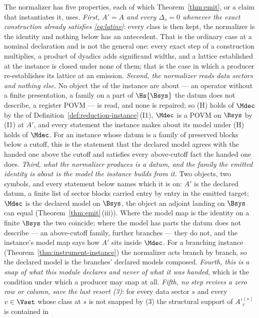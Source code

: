 \begin{definition}
The normalizer has five properties, each of which Theorem~\ref{thm:emit}, or
a claim that instantiates it, uses.
\emph{First, $A'=A$ and every $\Delta_s=0$ whenever the exact construction
already satisfies \eqref{eq:latinv}}: every class is then kept, the
normalizer is the identity and nothing below has an antecedent. That is the
ordinary case at a nominal declaration and is not the general one: every
exact step of a construction multiplies, a product of dyadics adds
significand widths, and a lattice established at the instance is closed
under none of them; that is the case in which a producer re-establishes its
lattice at an emission.
\emph{Second, the normalizer reads data sectors and nothing else.} No object
the  of the instance are about --- an operator without a finite
presentation, a family on a part of $\Hs{\Bsys}$ the datum does not describe,
a register POVM --- is read, and none is repaired; so (H) holds of $\Mdec$
by the  of
Definition~\ref{def:reduction-instance}\,(I1), $\Mdec$ is a POVM on $\Bsys$
by (I1) at $A'$, and every statement the instance makes about its model under
(H) holds of $\Mdec$. For an instance whose datum is a family of preserved
blocks below a cutoff, this is the statement that the declared model agrees
with the handed one above the cutoff and satisfies every above-cutoff fact the
handed one does.
\emph{Third, what the normalizer produces is a datum, and the family the
emitted identity is about is the model the instance builds from it.} Two
objects, two symbols, and every statement below names which it is on: $A'$ is
the declared datum, a finite list of sector blocks carried entry by entry in
the emitted target; $\Mdec$ is the declared model on $\Bsys$, the object an
adjoint landing on $\Bsys$ can equal (Theorem~\ref{thm:emit}\,(iii)). Where
the model map is the identity on a finite $\Bsys$ the two coincide; where the
model has parts the datum does not describe --- an above-cutoff family,
further branches --- they do not, and the instance's model map says how $A'$
sits inside $\Mdec$. For a branching instance
(Theorem~\ref{thm:instrument-instance}) the normalizer acts branch by branch,
so the declared model is the branches' declared models composed.
\emph{Fourth, this is a snap of what this module declares and never of what it
was handed}, which is the condition under
which a producer may snap at all.
\emph{Fifth, no step revives a zero row or column, save the last resort
(3)}: for every data sector $s$ and every $v\in\Vset$ whose class at $s$ is
not snapped by (3) the structural support of $A'^{(s)}_v$ is contained in

\end{definition}
